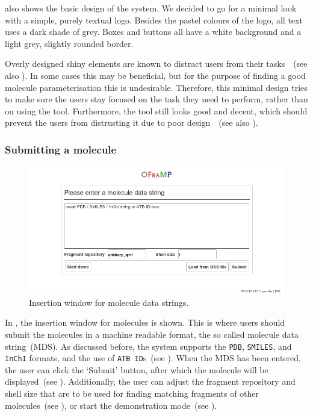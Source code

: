  also shows the basic design of the system. We decided to go for a minimal look with a simple, purely textual logo. Besides the pastel colours of the logo, all text uses a dark shade of grey. Boxes and buttons all have a white background and a light grey, slightly rounded border.

Overly designed shiny elements are known to distract users from their tasks~\cite{norman1990interfaces}~(see also ). In some cases this may be beneficial, but for the purpose of finding a good molecule parameterisation this is undesirable. Therefore, this minimal design tries to make sure the users stay focused on the task they need to perform, rather than on using the tool. Furthermore, the tool still looks good and decent, which should prevent the users from distrusting it due to poor design~\cite{norman2002emotion}~(see also ).

\subsubsection{Submitting a molecule}

\begin{figure}
\center
\includegraphics[width=.9\textwidth]{img/impl_inserting.png}
\vspace{-.2cm}
\caption{Insertion window for molecule data strings.}
\vspace{-.2cm}
\end{figure}

In , the insertion window for molecules is shown. This is where users should submit the molecules in a machine readable format, the so called molecule data string~(MDS). As discussed before, the system supports the \verb|PDB|, \verb|SMILES|, and \verb|InChI| formats, and the use of \verb|ATB ID|s~(see ). When the MDS has been entered, the user can click the `Submit' button, after which the molecule will be displayed~(see ). Additionally, the user can adjust the fragment repository and shell size that are to be used for finding matching fragments of other molecules~(see ), or start the demonstration mode~(see ).


